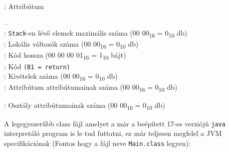 \begin{compactitem}
\begin{compactitem}
\begin{compactitem}
        : Attribútum
            \begin{compactitem}
            \setlength\itemsep{0px}
                \item[–]       \\
                : \lstinline{Stack}-en lévő elemek maximális száma (00 00\textsubscript{16} = 0\textsubscript{10} db)  \\
                : Lokális változók száma (00 00\textsubscript{16} = 0\textsubscript{10} db) \\
                : Kód hossza (00 00 00 01\textsubscript{16} = 1\textsubscript{10} bájt) \\
                : Kód \lstinline{(B1 = return)}  \\
                : Kivételek száma (00 00\textsubscript{16} = 0\textsubscript{10} db) \\
                : Attribútum attribútumainak száma (00 00\textsubscript{16} = 0\textsubscript{10} db)
        \end{compactitem}
    \end{compactitem}
\end{compactitem}
\item {}: Osztály attribútumainak száma (00 00\textsubscript{16} = 0\textsubscript{10} db)
\end{compactitem}

A legegyszerűbb class fájl amelyet a már a beépített 17-es verziójú \lstinline{java} interpretáló program is le tud futtatni, ez már teljesen megfelel a JVM specifikációnak (Fontos hogy a fájl neve \lstinline{Main.class} legyen):

